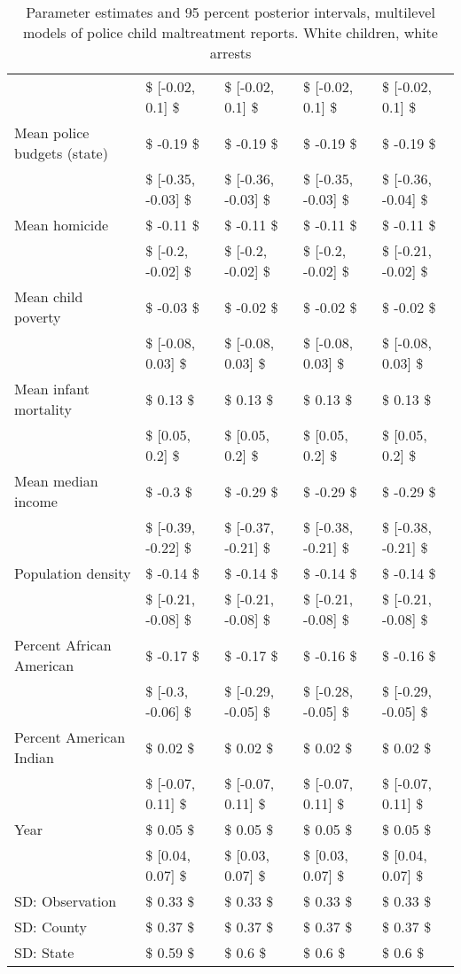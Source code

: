 \begin{table}[ht]
\begin{tabular}{lllll}
   & \$ [-0.02, 0.1] \$ & \$ [-0.02, 0.1] \$ & \$ [-0.02, 0.1] \$ & \$ [-0.02, 0.1] \$ \\ 
  Mean police budgets (state) & \$ -0.19 \$ & \$ -0.19 \$ & \$ -0.19 \$ & \$ -0.19 \$ \\ 
   & \$ [-0.35, -0.03] \$ & \$ [-0.36, -0.03] \$ & \$ [-0.35, -0.03] \$ & \$ [-0.36, -0.04] \$ \\ 
  Mean homicide & \$ -0.11 \$ & \$ -0.11 \$ & \$ -0.11 \$ & \$ -0.11 \$ \\ 
   & \$ [-0.2, -0.02] \$ & \$ [-0.2, -0.02] \$ & \$ [-0.2, -0.02] \$ & \$ [-0.21, -0.02] \$ \\ 
  Mean child poverty & \$ -0.03 \$ & \$ -0.02 \$ & \$ -0.02 \$ & \$ -0.02 \$ \\ 
   & \$ [-0.08, 0.03] \$ & \$ [-0.08, 0.03] \$ & \$ [-0.08, 0.03] \$ & \$ [-0.08, 0.03] \$ \\ 
  Mean infant mortality & \$ 0.13 \$ & \$ 0.13 \$ & \$ 0.13 \$ & \$ 0.13 \$ \\ 
   & \$ [0.05, 0.2] \$ & \$ [0.05, 0.2] \$ & \$ [0.05, 0.2] \$ & \$ [0.05, 0.2] \$ \\ 
  Mean median income & \$ -0.3 \$ & \$ -0.29 \$ & \$ -0.29 \$ & \$ -0.29 \$ \\ 
   & \$ [-0.39, -0.22] \$ & \$ [-0.37, -0.21] \$ & \$ [-0.38, -0.21] \$ & \$ [-0.38, -0.21] \$ \\ 
  Population density & \$ -0.14 \$ & \$ -0.14 \$ & \$ -0.14 \$ & \$ -0.14 \$ \\ 
   & \$ [-0.21, -0.08] \$ & \$ [-0.21, -0.08] \$ & \$ [-0.21, -0.08] \$ & \$ [-0.21, -0.08] \$ \\ 
  Percent African American & \$ -0.17 \$ & \$ -0.17 \$ & \$ -0.16 \$ & \$ -0.16 \$ \\ 
   & \$ [-0.3, -0.06] \$ & \$ [-0.29, -0.05] \$ & \$ [-0.28, -0.05] \$ & \$ [-0.29, -0.05] \$ \\ 
  Percent American Indian & \$ 0.02 \$ & \$ 0.02 \$ & \$ 0.02 \$ & \$ 0.02 \$ \\ 
   & \$ [-0.07, 0.11] \$ & \$ [-0.07, 0.11] \$ & \$ [-0.07, 0.11] \$ & \$ [-0.07, 0.11] \$ \\ 
  Year & \$ 0.05 \$ & \$ 0.05 \$ & \$ 0.05 \$ & \$ 0.05 \$ \\ 
   & \$ [0.04, 0.07] \$ & \$ [0.03, 0.07] \$ & \$ [0.03, 0.07] \$ & \$ [0.04, 0.07] \$ \\ 
  SD: Observation & \$ 0.33 \$ & \$ 0.33 \$ & \$ 0.33 \$ & \$ 0.33 \$ \\ 
  SD: County & \$ 0.37 \$ & \$ 0.37 \$ & \$ 0.37 \$ & \$ 0.37 \$ \\ 
  SD: State & \$ 0.59 \$ & \$ 0.6 \$ & \$ 0.6 \$ & \$ 0.6 \$ \\ 
   \hline
\end{tabular}
\caption{Parameter estimates and 95 percent posterior intervals, multilevel models of 
             police child maltreatment reports. White children, white arrests} 
\end{table}
